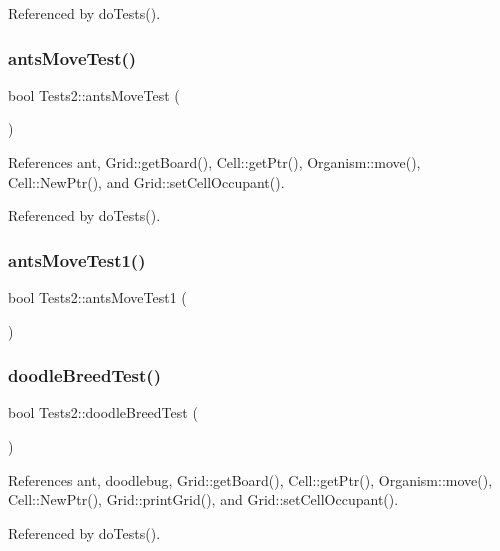 Referenced by do\+Tests().

\mbox{\label{classTests2_a7694d2797eba6fadc40234d527f6afbe}} 
\subsubsection{ants\+Move\+Test()}
{\footnotesize\ttfamily bool Tests2\+::ants\+Move\+Test (\begin{DoxyParamCaption}{ }\end{DoxyParamCaption})}



References ant, Grid\+::get\+Board(), Cell\+::get\+Ptr(), Organism\+::move(), Cell\+::\+New\+Ptr(), and Grid\+::set\+Cell\+Occupant().



Referenced by do\+Tests().

\mbox{\label{classTests2_ad3b43320ed586fe37b8feba46ddbd0bd}} 
\subsubsection{ants\+Move\+Test1()}
{\footnotesize\ttfamily bool Tests2\+::ants\+Move\+Test1 (\begin{DoxyParamCaption}{ }\end{DoxyParamCaption})}

\mbox{\label{classTests2_a317dc926bf93038f188c999df7a85682}} 
\subsubsection{doodle\+Breed\+Test()}
{\footnotesize\ttfamily bool Tests2\+::doodle\+Breed\+Test (\begin{DoxyParamCaption}{ }\end{DoxyParamCaption})}



References ant, doodlebug, Grid\+::get\+Board(), Cell\+::get\+Ptr(), Organism\+::move(), Cell\+::\+New\+Ptr(), Grid\+::print\+Grid(), and Grid\+::set\+Cell\+Occupant().



Referenced by do\+Tests().

